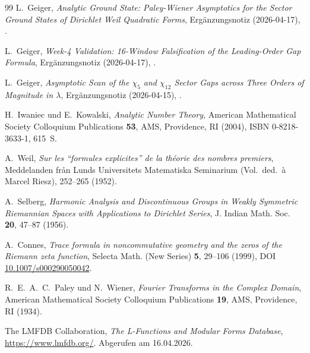 \documentclass[10pt,twocolumn]{article}
\theoremstyle{definition}
\theoremstyle{remark}
\begin{document}
\begin{thebibliography}{99}
L.~Geiger,
\textit{Analytic Ground State: Paley-Wiener Asymptotics for the
Sector Ground States of Dirichlet Weil Quadratic Forms},
Ergänzungsnotiz (2026-04-17),
.

L.~Geiger,
\textit{Week-4 Validation: 16-Window Falsification of the
Leading-Order Gap Formula},
Ergänzungsnotiz (2026-04-17),
.

L.~Geiger,
\textit{Asymptotic Scan of the $\chi_5$ and $\chi_{12}$ Sector Gaps
across Three Orders of Magnitude in $\lambda$},
Ergänzungsnotiz (2026-04-15),
.


H.~Iwaniec und E.~Kowalski,
\textit{Analytic Number Theory},
American Mathematical Society Colloquium Publications \textbf{53},
AMS, Providence, RI (2004), ISBN 0-8218-3633-1, 615~S.

A.~Weil,
\textit{Sur les ``formules explicites'' de la th\'eorie des nombres
premiers},
Meddelanden fr\aa n Lunds Universitets Matematiska Seminarium
(Vol.\ ded.\ \`a Marcel Riesz), 252--265 (1952).

A.~Selberg,
\textit{Harmonic Analysis and Discontinuous Groups in Weakly
Symmetric Riemannian Spaces with Applications to Dirichlet Series},
J. Indian Math. Soc. \textbf{20}, 47--87 (1956).

A.~Connes,
\textit{Trace formula in noncommutative geometry and the zeros of
the Riemann zeta function},
Selecta Math. (New Series) \textbf{5}, 29--106 (1999),
DOI \href{https://doi.org/10.1007/s000290050042}{10.1007/s000290050042}.

R.~E.~A.~C.~Paley und N.~Wiener,
\textit{Fourier Transforms in the Complex Domain},
American Mathematical Society Colloquium Publications \textbf{19},
AMS, Providence, RI (1934).

The LMFDB Collaboration,
\textit{The L-Functions and Modular Forms Database},
\url{https://www.lmfdb.org/}. Abgerufen am 16.04.2026.

\end{thebibliography}
\end{document}
